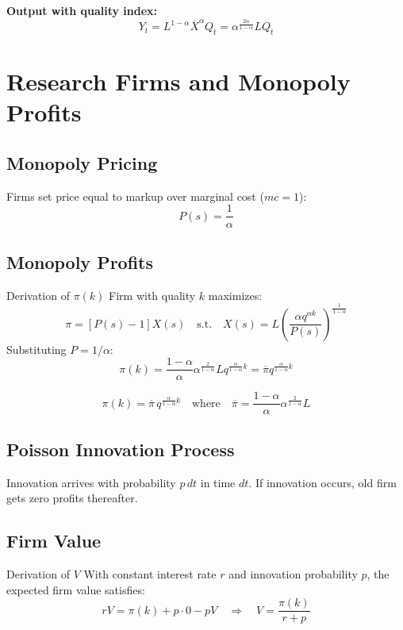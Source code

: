 \documentclass[a4paper,11pt]{article}
\begin{document}
\medskip
\noindent \textbf{Output with quality index:}
\[
Y_t = L^{1-\alpha} \overline{X}^\alpha Q_t = \alpha^{\frac{2\alpha}{1-\alpha}} L Q_t
\]

\clearpage

\section{Research Firms and Monopoly Profits}

\subsection*{Monopoly Pricing}
Firms set price equal to markup over marginal cost ($mc = 1$):
\[
P(s) = \frac{1}{\alpha}
\tag{Optimal Price}
\]

\subsection*{Monopoly Profits}
\begin{derivationbox}{Derivation of $\pi(k)$}
Firm with quality $k$ maximizes:
\[
\pi = [P(s) - 1] X(s) \quad \text{s.t.} \quad X(s) = L\left(\frac{\alpha q^{\alpha k}}{P(s)}\right)^{\frac{1}{1-\alpha}}
\]
Substituting $P = 1/\alpha$:
\[
\pi(k) = \frac{1-\alpha}{\alpha}\alpha^{\frac{2}{1-\alpha}} L q^{\frac{\alpha}{1-\alpha}k} = \overline{\pi} q^{\frac{\alpha}{1-\alpha}k}
\]
\end{derivationbox}

\[
\boxed{\pi(k) = \overline{\pi} \, q^{\frac{\alpha}{1-\alpha}k}}
\quad \text{where} \quad \overline{\pi} = \frac{1-\alpha}{\alpha}\alpha^{\frac{2}{1-\alpha}}L
\tag{Profits}
\]

\subsection*{Poisson Innovation Process}
Innovation arrives with probability $p \, dt$ in time $dt$. If innovation occurs, old firm gets zero profits thereafter.

\subsection*{Firm Value}
\begin{derivationbox}{Derivation of $V$}
With constant interest rate $r$ and innovation probability $p$, the expected firm value satisfies:
\[
rV = \pi(k) + p \cdot 0 - pV \quad \Rightarrow \quad V = \frac{\pi(k)}{r + p}
\]
\end{derivationbox}
\end{document}

